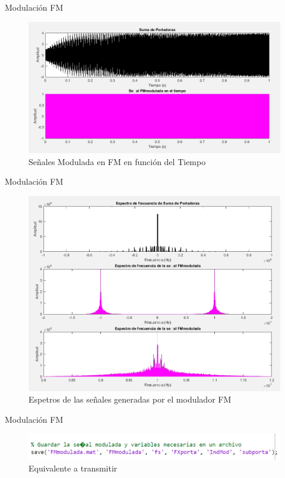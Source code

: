 \documentclass[mathserif,spanish]{beamer}
\begin{document}
\begin{frame}{Modulación FM}
    \begin{figure}[h]
        \centering
        \includegraphics[scale=0.3]{Esp_FM_tiem.png}
        \caption{Señales Modulada en FM en función del Tiempo}
    \end{figure}
\end{frame}

\begin{frame}{Modulación FM}
    \begin{figure}[h]
        \centering
        \includegraphics[scale=0.2]{Esp_FM_frec.png}
        \caption{Espetros de las señales generadas por el modulador FM}
    \end{figure}
\end{frame}



\begin{frame}{Modulación FM}
    \begin{figure}[h]
        \centering
        \includegraphics[scale=0.4]{Func_mod.png}
        \caption{Equivalente a transmitir}
    \end{figure}

\end{frame}
\end{document}
